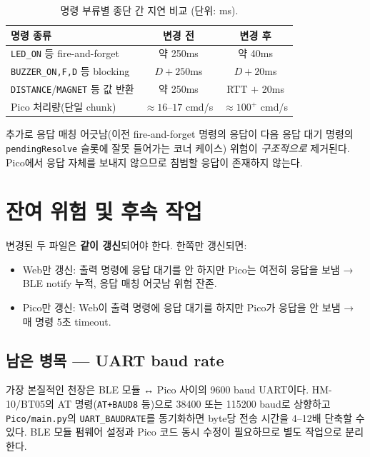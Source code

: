 \documentclass[11pt, oneside]{article}
\begin{document}
\begin{table}[h]
\centering
\small
\begin{tabular}{@{}lcc@{}}
\toprule
명령 종류 & 변경 전 & 변경 후 \\
\midrule
\texttt{LED\_ON} 등 fire-and-forget & 약 250ms & 약 40ms \\
\texttt{BUZZER\_ON,F,D} 등 blocking & $D + 250$ms & $D + 20$ms \\
\texttt{DISTANCE}/\texttt{MAGNET} 등 값 반환 & 약 250ms & RTT $+$ 20ms \\
Pico 처리량(단일 chunk) & $\approx 16$--$17$ cmd/s & $\approx 100^+$ cmd/s \\
\bottomrule
\end{tabular}
\caption{명령 부류별 종단 간 지연 비교 (단위: ms).}
\end{table}

추가로 응답 매칭 어긋남(이전 fire-and-forget 명령의 응답이 다음
응답 대기 명령의 \texttt{pendingResolve} 슬롯에 잘못 들어가는 코너
케이스) 위험이 \emph{구조적으로} 제거된다. Pico에서 응답 자체를
보내지 않으므로 침범할 응답이 존재하지 않는다.

\section{잔여 위험 및 후속 작업}

\begin{caution}
변경된 두 파일은 \textbf{같이 갱신}되어야 한다. 한쪽만 갱신되면:
\begin{itemize}
  \item Web만 갱신: 출력 명령에 응답 대기를 안 하지만 Pico는 여전히
        응답을 보냄 → BLE notify 누적, 응답 매칭 어긋남 위험 잔존.
  \item Pico만 갱신: Web이 출력 명령에 응답 대기를 하지만 Pico가 응답을
        안 보냄 → 매 명령 5초 timeout.
\end{itemize}
\end{caution}

\subsection{남은 병목 — UART baud rate}

가장 본질적인 천장은 BLE 모듈 ↔ Pico 사이의 9600 baud UART이다.
HM-10/BT05의 AT 명령(\texttt{AT+BAUD8} 등)으로 38400 또는 115200 baud로
상향하고 \texttt{Pico/main.py}의 \texttt{UART\_BAUDRATE}를 동기화하면
byte당 전송 시간을 4--12배 단축할 수 있다. BLE 모듈 펌웨어 설정과
Pico 코드 동시 수정이 필요하므로 별도 작업으로 분리한다.
\end{document}
